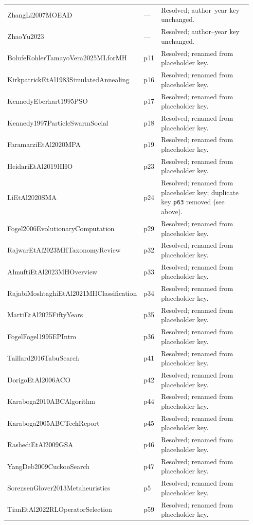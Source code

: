 \documentclass[9pt]{article}
\begin{document}
\begin{longtable}{P{5.4cm}P{4.0cm}P{4.4cm}}
ZhangLi2007MOEAD & --- & Resolved; author--year key unchanged. \\
ZhaoYu2023 & --- & Resolved; author--year key unchanged. \\
BolufeRohlerTamayoVera2025MLforMH & p11 & Resolved; renamed from placeholder key. \\
KirkpatrickEtAl1983SimulatedAnnealing & p16 & Resolved; renamed from placeholder key. \\
KennedyEberhart1995PSO & p17 & Resolved; renamed from placeholder key. \\
Kennedy1997ParticleSwarmSocial & p18 & Resolved; renamed from placeholder key. \\
FaramarziEtAl2020MPA & p19 & Resolved; renamed from placeholder key. \\
HeidariEtAl2019HHO & p23 & Resolved; renamed from placeholder key. \\
LiEtAl2020SMA & p24 & Resolved; renamed from placeholder key; duplicate key \texttt{p63} removed (see above). \\
Fogel2006EvolutionaryComputation & p29 & Resolved; renamed from placeholder key. \\
RajwarEtAl2023MHTaxonomyReview & p32 & Resolved; renamed from placeholder key. \\
AlmuftiEtAl2023MHOverview & p33 & Resolved; renamed from placeholder key. \\
RajabiMoshtaghiEtAl2021MHClassification & p34 & Resolved; renamed from placeholder key. \\
MartiEtAl2025FiftyYears & p35 & Resolved; renamed from placeholder key. \\
FogelFogel1995EPIntro & p36 & Resolved; renamed from placeholder key. \\
Taillard2016TabuSearch & p41 & Resolved; renamed from placeholder key. \\
DorigoEtAl2006ACO & p42 & Resolved; renamed from placeholder key. \\
Karaboga2010ABCAlgorithm & p44 & Resolved; renamed from placeholder key. \\
Karaboga2005ABCTechReport & p45 & Resolved; renamed from placeholder key. \\
RashediEtAl2009GSA & p46 & Resolved; renamed from placeholder key. \\
YangDeb2009CuckooSearch & p47 & Resolved; renamed from placeholder key. \\
SorensenGlover2013Metaheuristics & p5 & Resolved; renamed from placeholder key. \\
TianEtAl2022RLOperatorSelection & p59 & Resolved; renamed from placeholder key. \\

\end{longtable}
\end{document}
